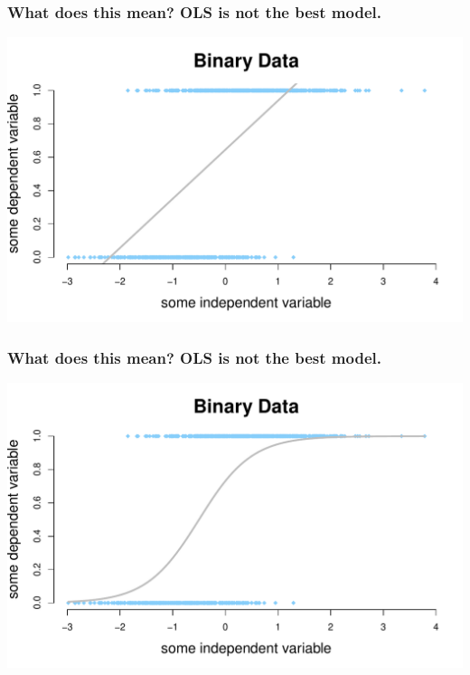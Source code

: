 \documentclass[aspectratio=169]{beamer}
\begin{document}
\begin{frame}
\frametitle{What does this mean?  OLS is not the best model.}
\begin{center}
\includegraphics[scale=0.55]{binary_data_w_line.pdf}
\end{center}
\end{frame}

\begin{frame}
\frametitle{What does this mean?  OLS is not the best model.}
\begin{center}
\includegraphics[scale=0.55]{binary_data_w_s_curve.pdf}
\end{center}
\end{frame}
\end{document}
